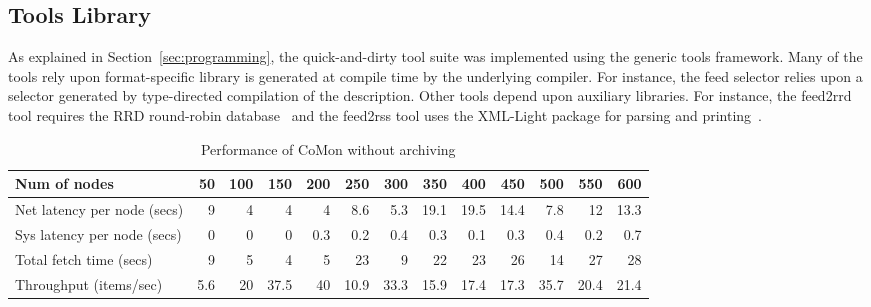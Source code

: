 \subsection{Tools Library}
As explained in Section~\ref{sec:programming},
the quick-and-dirty tool suite was implemented using the
generic tools framework.  Many of the tools rely upon
format-specific library is generated at compile time by the underlying
\padsml{} compiler.  For instance, the feed selector relies upon 
a selector generated by type-directed compilation of the \padsml{}
description.  Other tools depend upon auxiliary libraries.
For instance, the feed2rrd tool requires the RRD round-robin 
database~\cite{rrdtool}
and the feed2rss tool uses the XML-Light package for parsing
and printing~\cite{xmllight}.

\begin{table*}[th]
\begin{center}
\begin{tabular}{|l|r|r|r|r|r|r|r|r|r|r|r|r|}\hline
Num of nodes&	50&	100&	150&	200&	250&	300&	350&	400&	450&	500&	550&	600 \\ \hline\hline
Net latency per node (secs)&	9&	4&	4&	4&	8.6&	5.3&	19.1&	19.5&	14.4&	7.8&	12&	13.3 \\ \hline
Sys latency per node (secs)&	0&	0&	0&	0.3&	0.2&	0.4&	0.3&	0.1&	0.3&	0.4&	0.2&	0.7 \\ \hline
Total fetch time (secs)&	9&	5&	4&	5&	23&	9&	22&	23&	26&	14&	27&	28 \\ \hline	
Throughput (items/sec)&	5.6&	20&	37.5&	40&	10.9&	33.3&	15.9&	17.4&	17.3&	35.7&	20.4&	21.4 \\ \hline
\end{tabular}
\end{center}
\caption{Performance of CoMon without archiving}
\label{tab:comon-noarch}
\end{table*}


